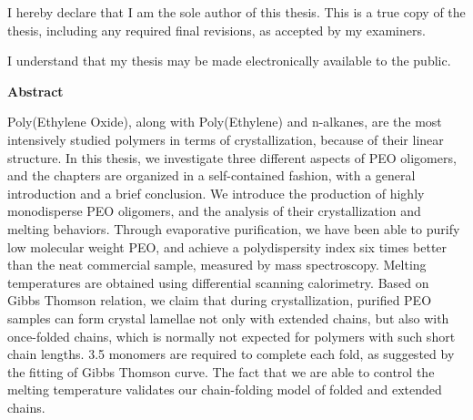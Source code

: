 \doublespacing

  \noindent
I hereby declare that I am the sole author of this thesis. This is a true copy of the thesis, including any required final revisions, as accepted by my examiners.

  \bigskip
  
  \noindent
I understand that my thesis may be made electronically available to the public.

\cleardoublepage


\begin{center}\textbf{Abstract}\end{center}

Poly(Ethylene Oxide), along with Poly(Ethylene) and n-alkanes, are the most intensively studied polymers in terms of crystallization, because of their linear structure. In this thesis, we investigate three different aspects of PEO oligomers, and the chapters are organized in a self-contained fashion, with a general introduction and a brief conclusion. We introduce the production of highly monodisperse PEO oligomers, and the analysis of their crystallization and melting behaviors. Through evaporative purification, we have been able to purify low molecular weight PEO, and achieve a polydispersity index six times better than the neat commercial sample, measured by mass spectroscopy. Melting temperatures are obtained using differential scanning calorimetry. Based on Gibbs Thomson relation, we claim that during crystallization, purified PEO samples can form crystal lamellae not only with extended chains, but also with once-folded chains, which is normally not expected for polymers with such short chain lengths. 3.5 monomers are required to complete each fold, as suggested by the fitting of Gibbs Thomson curve. The fact that we are able to control the melting temperature validates our chain-folding model of folded and extended chains.

\cleardoublepage




